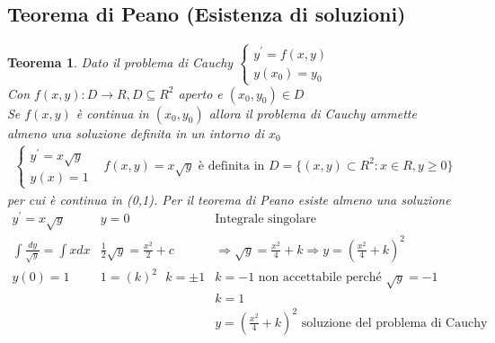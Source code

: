 \documentclass{book}
\newtheorem{teorema}{Teorema}
\begin{document}
\subsection{Teorema di Peano (Esistenza di soluzioni)}
\begin{teorema}
  Dato il problema di Cauchy $\begin{cases} y^\prime=f(x,y)\\ y(x_0)=y_0\end{cases}$\\
  Con $f(x,y):D \to R, D \subseteq R^2$ aperto e $(x_0,y_0)\in D$\\
  Se $f(x,y)$ è continua in $(x_0,y_0)$ allora il problema di Cauchy ammette almeno una
  soluzione definita in un intorno di $x_0$
  \begin{eqnarray*}
    \begin{cases}
      y^\prime=x\sqrt{y}\\
      y(x)=1
    \end{cases}& f(x,y)=x\sqrt{y} \text{ è definita in } D=\{(x,y)\subset R^2:x\in R,
    y\geq 0\}
  \end{eqnarray*}
  per cui è continua in (0,1). Per il teorema di Peano esiste almeno una soluzione
  \begin{eqnarray*}
    y^\prime=x\sqrt{y} & y=0 & \text{Integrale singolare}\\
    \int \frac{dy}{\sqrt{y}} =\int xdx& \frac{1}{2} \sqrt{y}=\frac{x^2}{2}+c
                             & \Rightarrow \sqrt{y}=\frac{x^2}{4}+k \Rightarrow y=\left(
                               \frac{x^2}{4}+k\right)^2\\
    y(0)=1 & 1=(k)^2\text{ } k=\pm 1 & k=-1 \text{ non accettabile perché } \sqrt{y}=-1\\
    && k=1\\
    && y=\left(\frac{x^2}{4}+k\right)^2 \text{ soluzione del problema di Cauchy}
  \end{eqnarray*}
\end{teorema}
\end{document}
